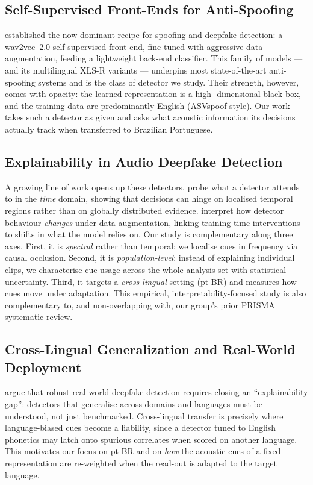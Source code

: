 \documentclass[sigconf]{acmart}
\begin{document}
\subsection{Self-Supervised Front-Ends for Anti-Spoofing}
\citet{tak2022automatic} established the now-dominant recipe for spoofing and
deepfake detection: a wav2vec~2.0 self-supervised front-end, fine-tuned with
aggressive data augmentation, feeding a lightweight back-end classifier. This
family of models --- and its multilingual XLS-R variants --- underpins most
state-of-the-art anti-spoofing systems and is the class of detector we study. Their
strength, however, comes with opacity: the learned representation is a high-%
dimensional black box, and the training data are predominantly English
(ASVspoof-style). Our work takes such a detector as given and asks what acoustic
information its decisions actually track when transferred to Brazilian Portuguese.

\subsection{Explainability in Audio Deepfake Detection}
A growing line of work opens up these detectors. \citet{grinberg2025does} probe
what a detector attends to in the \emph{time} domain, showing that decisions can
hinge on localised temporal regions rather than on globally distributed evidence.
\citet{fullwood2025seeing} interpret how detector behaviour \emph{changes} under
data augmentation, linking training-time interventions to shifts in what the model
relies on. Our study is complementary along three axes. First, it is
\emph{spectral} rather than temporal: we localise cues in frequency via causal
occlusion. Second, it is \emph{population-level}: instead of explaining individual
clips, we characterise cue usage across the whole analysis set with statistical
uncertainty. Third, it targets a \emph{cross-lingual} setting (pt-BR) and measures
how cues move under adaptation. This empirical, interpretability-focused study is
also complementary to, and non-overlapping with, our group's prior PRISMA
systematic review.

\subsection{Cross-Lingual Generalization and Real-World Deployment}
\citet{channing2024toward} argue that robust real-world deepfake detection requires
closing an ``explainability gap'': detectors that generalise across domains and
languages must be understood, not just benchmarked. Cross-lingual transfer is
precisely where language-biased cues become a liability, since a detector tuned to
English phonetics may latch onto spurious correlates when scored on another
language. This motivates our focus on pt-BR and on \emph{how} the acoustic cues of
a fixed representation are re-weighted when the read-out is adapted to the target
language.
\end{document}
